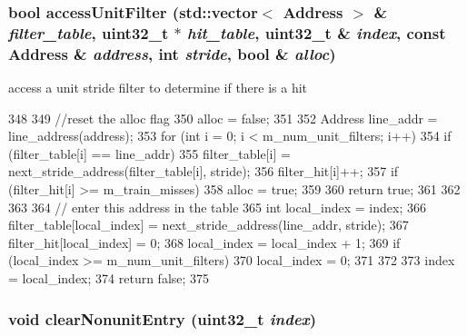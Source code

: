 \hypertarget{classPrefetcher_ab7279136d42cc2cc34787356c5dc6f67}{
\subsubsection[{accessUnitFilter}]{\setlength{\rightskip}{0pt plus 5cm}bool accessUnitFilter ({\bf std::vector}$<$ {\bf Address} $>$ \& {\em filter\_\-table}, \/  {\bf uint32\_\-t} $\ast$ {\em hit\_\-table}, \/  {\bf uint32\_\-t} \& {\em index}, \/  const {\bf Address} \& {\em address}, \/  int {\em stride}, \/  bool \& {\em alloc})}}
\label{classPrefetcher_ab7279136d42cc2cc34787356c5dc6f67}


access a unit stride filter to determine if there is a hit 


\begin{DoxyCode}
348 {
349     //reset the alloc flag
350     alloc = false;
351 
352     Address line_addr = line_address(address);
353     for (int i = 0; i < m_num_unit_filters; i++) {
354         if (filter_table[i] == line_addr) {
355             filter_table[i] = next_stride_address(filter_table[i], stride);
356             filter_hit[i]++;
357             if (filter_hit[i] >= m_train_misses) {
358                 alloc = true;
359             }
360             return true;
361         }
362     }
363 
364     // enter this address in the table
365     int local_index = index;
366     filter_table[local_index] = next_stride_address(line_addr, stride);
367     filter_hit[local_index] = 0;
368     local_index = local_index + 1;
369     if (local_index >= m_num_unit_filters) {
370         local_index = 0;
371     }
372 
373     index = local_index;
374     return false;
375 }
\end{DoxyCode}
\hypertarget{classPrefetcher_a6bd67ad0a5fd462f191abb16d3c6bfa8}{
\subsubsection[{clearNonunitEntry}]{\setlength{\rightskip}{0pt plus 5cm}void clearNonunitEntry ({\bf uint32\_\-t} {\em index})}}
\label{classPrefetcher_a6bd67ad0a5fd462f191abb16d3c6bfa8}


